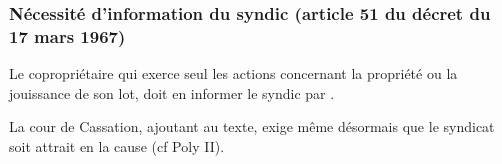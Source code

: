 		\subsubsection{Nécessité d'information du syndic (article 51 du décret du 17 mars 1967)}
		
			Le copropriétaire qui exerce seul les actions concernant la propriété ou la jouissance de son lot, doit en informer le syndic par \lrar.
		
			La cour de Cassation, ajoutant au texte, exige même désormais que le syndicat soit attrait en la cause (cf Poly II).